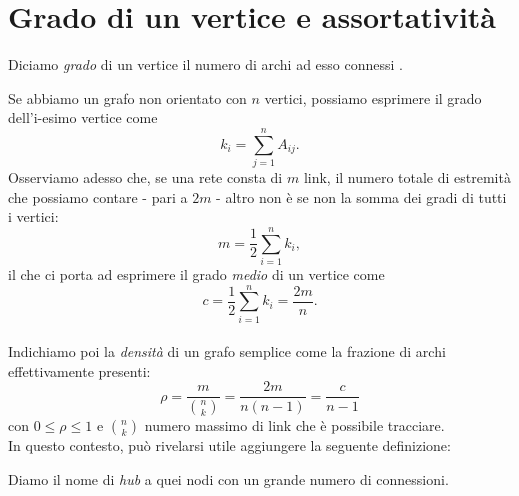 \section{Grado di un vertice e assortativit\`{a}}
\begin{definizione}
Diciamo \emph{grado} di un vertice il numero di archi ad esso connessi \cite{Lesniak}.
\end{definizione}
Se abbiamo un grafo non orientato con $ n $ vertici, possiamo esprimere il grado dell'i-esimo vertice come
\begin{equation}
	k_i = \sum_{j=1}^n A_{ij}.
\end{equation}
%
Osserviamo adesso che, se una rete consta di $ m $ link, il numero totale di estremità che possiamo contare - pari a $ 2m $ - altro non è se non la somma dei gradi di tutti i vertici: 
\begin{equation}
	m = \frac{1}{2} \sum_{i=1}^n k_i,
\end{equation}
il che ci porta ad esprimere il grado \emph{medio} di un vertice come 
\begin{equation}
 	c = \frac{1}{2} \sum_{i=1}^n k_i = \frac{2m}{n}. 
\end{equation}
 \\Indichiamo poi la \emph{densità} di un grafo semplice come la frazione di archi effettivamente presenti:
\begin{equation}
	\rho = \frac{m}{\binom{n}{k}} = \frac{2m}{n\left(n-1 \right)} = \frac{c}{n-1}
\end{equation}
con $ 0 \leq \rho \leq  1 $ e  $ \binom{n}{k} $  numero massimo di link che è possibile tracciare. \\ In questo contesto, può rivelarsi utile aggiungere la seguente definizione:
\begin{definizione}
	Diamo il nome di \emph{hub} a quei nodi con un grande numero di connessioni.
\end{definizione}

